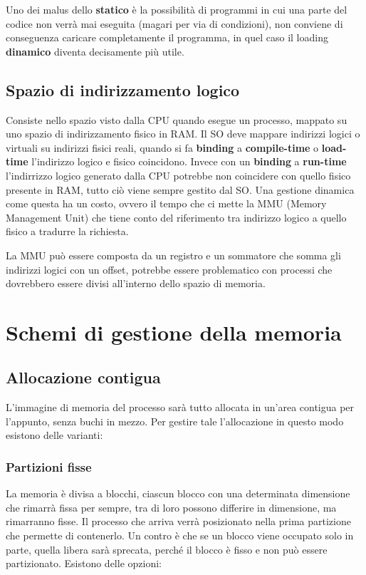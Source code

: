 \documentclass[a4paper, 12pt]{book}
\begin{document}
Uno dei malus dello \textbf{statico} è la possibilità di programmi in cui una parte del codice non verrà mai eseguita (magari
per via di condizioni), non conviene di conseguenza caricare completamente il programma, in quel caso il loading \textbf{dinamico}
diventa decisamente più utile.

\section{Spazio di indirizzamento logico}

Consiste nello spazio visto dalla CPU quando esegue un processo, mappato su uno spazio di indirizzamento fisico in RAM. Il SO 
deve mappare indirizzi logici o virtuali su indirizzi fisici reali, quando si fa \textbf{binding} a \textbf{compile-time} o
\textbf{load-time} l'indirizzo logico e fisico coincidono. Invece con un \textbf{binding} a \textbf{run-time} l'indirrizzo
logico generato dalla CPU potrebbe non coincidere con quello fisico presente in RAM, tutto ciò viene sempre gestito dal
SO. Una gestione dinamica come questa ha un costo, ovvero il tempo che ci mette la MMU (Memory Management Unit) che tiene 
conto del riferimento tra indirizzo logico a quello fisico a tradurre la richiesta.

La MMU può essere composta da un registro e un sommatore che somma gli indirizzi logici con un offset, potrebbe essere problematico
con processi che dovrebbero essere divisi all'interno dello spazio di memoria.

\chapter{Schemi di gestione della memoria}

\section{Allocazione contigua}

L'immagine di memoria del processo sarà tutto allocata in un'area contigua per l'appunto, senza buchi in mezzo. Per gestire tale
l'allocazione in questo modo esistono delle varianti:

\subsection{Partizioni fisse}

La memoria è divisa a blocchi, ciascun blocco con una determinata
    dimensione che rimarrà fissa per sempre, tra di loro possono differire in dimensione, ma rimarranno fisse. Il processo che arriva
    verrà posizionato nella prima partizione che permette di contenerlo. Un contro è che se un blocco viene occupato solo in 
    parte, quella libera sarà sprecata, perché il blocco è fisso e non può essere partizionato. Esistono delle opzioni:
\end{document}
